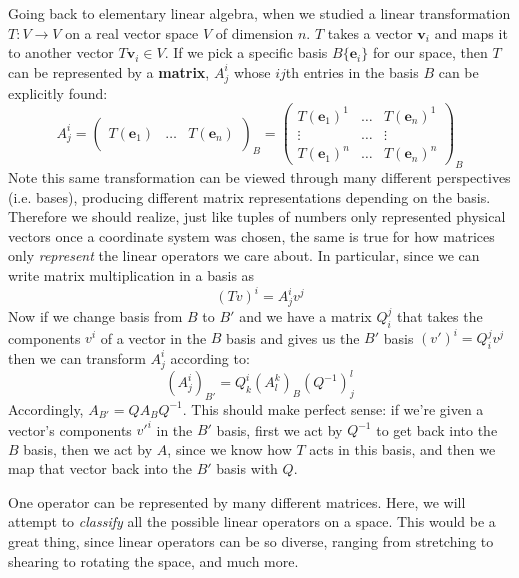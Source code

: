 Going back to elementary linear algebra, when we studied a linear transformation $T: V \rightarrow V$ on a real vector space $V$ of dimension $n$. $T$ takes a vector $\mathbf v_i$ and maps it to another vector $T\mathbf v_i \in V$. If we pick a specific basis $B \{ \mathbf e_i \}$ for our space, then $T$ can be represented by a \textbf{matrix}, $A^i_j$ whose $ij$th entries in the basis $B$ can be explicitly found: 
	\begin{equation}
		A^i_j = \begin{pmatrix}
			& & \\
			T(\mathbf e_1) & \dots & T(\mathbf e_n)\\
			& &
		\end{pmatrix}_B
		=\begin{pmatrix}
			T(\mathbf e_1)^1 & \dots & T(\mathbf e_n)^1 \\
			\vdots & \dots & \vdots\\
			T(\mathbf e_1)^n & \dots & T(\mathbf e_n)^n
		\end{pmatrix}_B
	\end{equation}
	Note this same transformation can be viewed through many different perspectives (i.e. bases), producing different matrix representations depending on the basis. Therefore we should realize, just like tuples of numbers only represented physical vectors once a coordinate system was chosen, the same is true for how matrices only \emph{represent} the linear operators we care about. In particular, since we can write matrix multiplication in a basis as
	\begin{equation}
		(Tv)^i = A^i_j v^j
	\end{equation}
	Now if we change basis from $B$ to $B'$ and we have a matrix $Q_i^j$ that takes the components $v^i$ of a vector in the $B$ basis and gives us the $B'$ basis $(v')^i = Q_i^j v^j$ then we can transform $A^i_j$ according to:
	\begin{equation}
		(A^i_j)_{B'} = Q^i_k (A^k_l)_B (Q^{-1})^l_j 
	\end{equation}
	Accordingly, $A_{B'} = Q A_B Q^{-1}$. This should make perfect sense: if we're given a vector's components ${v'}^i$ in the $B'$ basis, first we act by $Q^{-1}$ to get back into the $B$ basis, then we act by $A$, since we know how $T$ acts in this basis, and then we map that vector back into the $B'$ basis with $Q$.
	
	One operator can be represented by many different matrices. Here, we will attempt to \emph{classify} all the possible linear operators on a space. This would be a great thing, since linear operators can be so diverse, ranging from stretching to shearing to rotating the space, and much more. 
	
